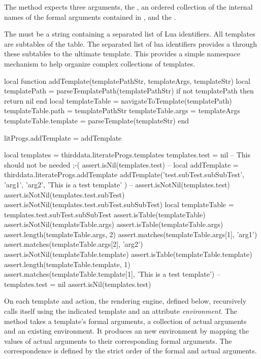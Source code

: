 {{The  method expects three arguments, the 
, an ordered collection of the internal names of the 
formal arguments contained in , and the 
. 

The  must be a string containing a  separated 
list of Lua identifiers. All templates are subtables of the 
 table. The  separated 
list of lua identifiers provides a  through these subtables to 
the ultimate template. This provides a simple namespace mechanism to help 
organize complex collections of templates. 

\startLuaCode
local function addTemplate(templatePathStr, templateArgs, templateStr)
  local templatePath = parseTemplatePath(templatePathStr)
  if not templatePath then return nil end
  local templateTable    = navigateToTemplate(templatePath)
  templateTable.path     = templatePathStr
  templateTable.args     = templateArgs
  templateTable.template = parseTemplate(templateStr)
end

litProgs.addTemplate = addTemplate
\stopLuaCode

\startLuaTest
local templates = thirddata.literateProgs.templates
templates.test = nil -- This should not be needed ;-(
assert.isNil(templates.test)
--
local addTemplate = thirddata.literateProgs.addTemplate
addTemplate('test.subTest.subSubTest',
  { 'arg1', 'arg2'},
  'This is a test template'
)
--
assert.isNotNil(templates.test)
assert.isNotNil(templates.test.subTest)
assert.isNotNil(templates.test.subTest.subSubTest)
local templateTable = templates.test.subTest.subSubTest
assert.isTable(templateTable)
assert.isNotNil(templateTable.args)
assert.isTable(templateTable.args)
assert.length(templateTable.args, 2)
assert.matches(templateTable.args[1], 'arg1')
assert.matches(templateTable.args[2], 'arg2')
assert.isNotNil(templateTable.template)
assert.isTable(templateTable.template)
assert.length(templateTable.template, 1)
assert.matches(templateTable.template[1], 'This is a test template')
--
templates.test = nil
assert.isNil(templates.test)
\stopLuaTest
\stopTestCase
\stopTestSuite

\startTestSuite[buildNewEnv]

On each template  and  action, the 
 rendering engine, defined below, recursively calls itself 
using the indicated template and an attribute \emph{environment}. The 
 method takes a template's formal arguments, a 
collection of actual arguments and an existing environment. It produces an 
new environment by mapping the values of actual arguments to their 
corresponding formal arguments. The correspondence is defined by the 
strict order of the formal and actual arguments. 

}}
